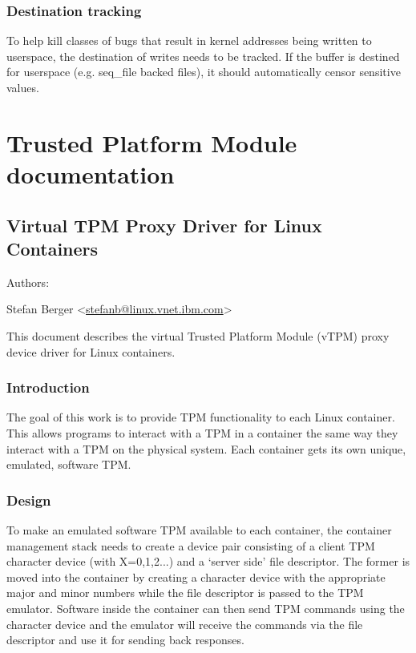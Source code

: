 \documentclass[a4paper,8pt,english]{sphinxmanual}
\begin{document}
\subsection{Destination tracking}
\label{security/self-protection:destination-tracking}
To help kill classes of bugs that result in kernel addresses being
written to userspace, the destination of writes needs to be tracked. If
the buffer is destined for userspace (e.g. seq\_file backed  files),
it should automatically censor sensitive values.


\chapter{Trusted Platform Module documentation}
\label{security/tpm/index:trusted-platform-module-documentation}\label{security/tpm/index::doc}

\section{Virtual TPM Proxy Driver for Linux Containers}
\label{security/tpm/tpm_vtpm_proxy:virtual-tpm-proxy-driver-for-linux-containers}\label{security/tpm/tpm_vtpm_proxy::doc}
\begin{DUlineblock}{0em}
\item[] Authors:
\item[] Stefan Berger \textless{}\href{mailto:stefanb@linux.vnet.ibm.com}{stefanb@linux.vnet.ibm.com}\textgreater{}
\end{DUlineblock}

This document describes the virtual Trusted Platform Module (vTPM)
proxy device driver for Linux containers.


\subsection{Introduction}
\label{security/tpm/tpm_vtpm_proxy:introduction}
The goal of this work is to provide TPM functionality to each Linux
container. This allows programs to interact with a TPM in a container
the same way they interact with a TPM on the physical system. Each
container gets its own unique, emulated, software TPM.


\subsection{Design}
\label{security/tpm/tpm_vtpm_proxy:design}
To make an emulated software TPM available to each container, the container
management stack needs to create a device pair consisting of a client TPM
character device  (with X=0,1,2...) and a `server side' file
descriptor. The former is moved into the container by creating a character
device with the appropriate major and minor numbers while the file descriptor
is passed to the TPM emulator. Software inside the container can then send
TPM commands using the character device and the emulator will receive the
commands via the file descriptor and use it for sending back responses.
\end{document}
